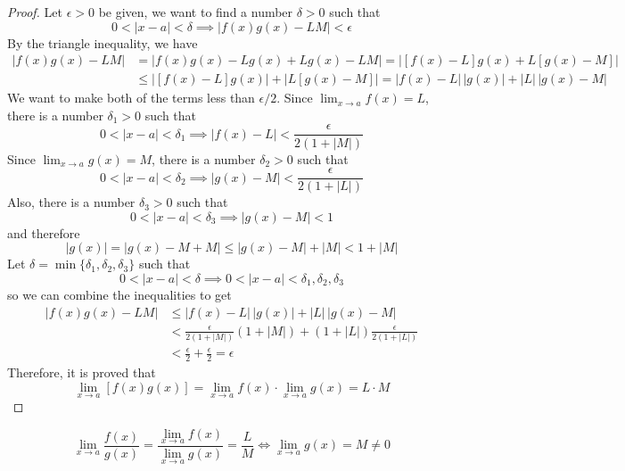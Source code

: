 \begin{proof}
    Let \(\epsilon>0\) be given, we want to find a number \(\delta>0\) such
    that \[0<|x-a|<\delta\implies|f(x)g(x)-LM|<\epsilon\]
    By the triangle inequality, we have
    \begin{align*}
        |f(x)g(x)-LM| &= |f(x)g(x)-Lg(x)+Lg(x)-LM|=|[f(x)-L]g(x)+L[g(x)-M]| \\
        &\leq |[f(x)-L]g(x)|+|L[g(x)-M]|=|f(x)-L|\,|g(x)|+|L|\,|g(x)-M|
    \end{align*}
    We want to make both of the terms less than \(\epsilon/2\).
    Since \(\lim_{x\to a}f(x)=L\), there is a number \(\delta_1>0\) such that
    \[0<|x-a|<\delta_1\implies|f(x)-L|<\frac{\epsilon}{2(1+|M|)}\]
    Since \(\lim_{x\to a}g(x)=M\), there is a number \(\delta_2>0\) such that
    \[0<|x-a|<\delta_2\implies|g(x)-M|<\frac{\epsilon}{2(1+|L|)}\]
    Also, there is a number \(\delta_3>0\) such that
    \[0<|x-a|<\delta_3\implies|g(x)-M|<1\] and therefore
    \[|g(x)|=|g(x)-M+M|\leq|g(x)-M|+|M|<1+|M|\]
    Let \(\delta=\min\{\delta_1,\delta_2,\delta_3\}\) such that
    \[0<|x-a|<\delta\implies0<|x-a|<\delta_1,\delta_2,\delta_3\]
    so we can combine the inequalities to get
    \begin{align*}
        |f(x)g(x)-LM|&\leq|f(x)-L|\,|g(x)|+|L|\,|g(x)-M| \\
        &<\frac{\epsilon}{2(1+|M|)}(1+|M|)+(1+|L|)\frac{\epsilon}{2(1+|L|)} \\
        &<\frac{\epsilon}{2}+\frac{\epsilon}{2}=\epsilon
    \end{align*}
    Therefore, it is proved that
    \[\lim_{x\to a}[f(x)g(x)]=\lim_{x\to a}f(x)\cdot\lim_{x\to a}g(x)
    =L\cdot M\]
\end{proof}
\begin{theorem}
    \[\lim_{x\to a}\frac{f(x)}{g(x)}
    =\frac{\lim_{x\to a}f(x)}{\lim_{x\to a}g(x)}
    =\frac{L}{M}\iff\lim_{x\to a}g(x)=M\neq0\]
\end{theorem}
